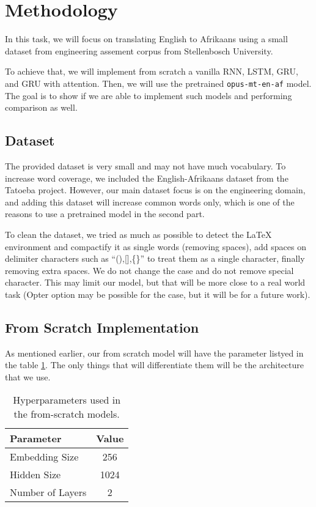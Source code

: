 \section{Methodology}
In this task, we will focus on translating English to Afrikaans using a small dataset from engineering assement corpus from Stellenbosch University.

To achieve that, we will implement from scratch a vanilla RNN, LSTM, GRU, and GRU with attention. Then, we will use the pretrained \texttt{opus-mt-en-af} model. The goal is to show if we are able to implement such models and performing comparison as well.


\subsection{Dataset}
The provided dataset is very small and may not have much vocabulary. To increase word coverage, we included the English-Afrikaans dataset from the Tatoeba project. However, our main dataset focus is on the engineering domain, and adding this dataset will increase common words only, which is one of the reasons to use a pretrained model in the second part.

To clean the dataset, we tried as much as possible to detect the LaTeX environment and compactify it as single words (removing spaces), add spaces on delimiter characters such as ``(),[],\{\}'' to treat them as a single character, finally removing extra spaces. We do not change the case and do not remove special character. This may limit our model, but that will be more close to a real world task (Opter option may be possible for the case, but it will be for a future work).

\subsection{From Scratch Implementation}
As mentioned earlier, our from scratch model will have the parameter listyed in the table \ref{tab:hyper}. The only things that will differentiate them will be the architecture that we use. 
\begin{table}[H]
    \centering
    \begin{tabular}{lc}
        \toprule
        Parameter & Value \\
        \midrule
        Embedding Size & 256 \\
        Hidden Size & 1024 \\
        Number of Layers & 2 \\
        \bottomrule
    \end{tabular}
    \caption{Hyperparameters used in the from-scratch models.}
	\label{tab:hyper}
\end{table}

